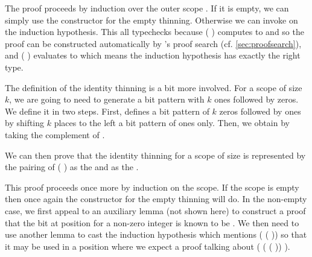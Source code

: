 
The proof proceeds by induction over the outer scope . If it
is empty, we can simply use the constructor for the empty thinning.
%
Otherwise we can invoke  on the induction hypothesis.
%
This all typechecks because (  )
computes to  and so the  proof can be constructed
automatically by \idris{}'s proof search (cf. \cref{sec:proofsearch}),
%
and (  ) evaluates to 
which means the induction hypothesis has exactly the right type.


The definition of the identity thinning is a bit more involved.
%
For a scope of size $k$, we are going to need to generate a bit pattern with
$k$ ones followed by zeros.
%
We define it in two steps.
%
First,  defines a bit pattern of $k$ zeros followed by ones
by shifting $k$ places to the left a bit pattern of ones only.
%
Then, we obtain  by taking the complement of .

\noindent
\begin{minipage}{.45\textwidth}
\end{minipage}\hfill
\begin{minipage}{.45\textwidth}
\end{minipage}

We can then prove that the identity thinning for a scope of size  is
represented by the pairing of ( ) as the
 and  as the .



This proof proceeds once more by induction on the scope.
%
If the scope is empty then once again the constructor for the empty thinning will do.
%
In the non-empty case, we first appeal to an auxiliary lemma (not shown here) to
construct  a proof that the bit at position  for a
non-zero  integer is known to be .
%
We then need to use another lemma to cast the induction hypothesis which mentions
( ( )) so that it may be
used in a position where we expect a proof talking about
( ( ( \IdrisData{:<} ))
 ).

